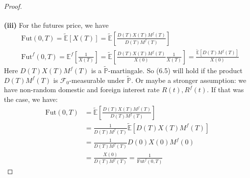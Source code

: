 \documentclass[a4paper, 10pt]{article}
\theoremstyle{definition}
\theoremstyle{hSol}
\begin{document}
\begin{proof}
\begin{equation}
\end{equation}
~\\
\textbf{(iii)} For the futures price, we have
\begin{equation}
  \begin{split}
    &\text{Fut}(0,T) = \widetilde{\mathbb{E}}\left[X(T)\right] = \widetilde{\mathbb{E}}\left[\frac{D(T)X(T)M^f(T)}{D(T)M^f(T)}\right] \\
    &\text{Fut}^f(0,T) = \mathbb{E}^f\left[\frac{1}{X(T)}\right] = \widetilde{\mathbb{E}}\left[\frac{D(T)X(T)M^f(T)}{X(0)}\frac{1}{X(T)}\right] = \frac{\widetilde{\mathbb{E}}\left[D(T)M^f(T)\right]}{X(0)}
  \end{split}
\end{equation}
Here $D(T)X(T)M^f(T)$ is a $\widetilde{\mathbb{P}}$-martingale. So (6.5) will hold if the product $D(T)M^f(T)$ is $\mathcal{F}_0$-measurable under $\widetilde{\mathbb{P}}$. Or maybe a stronger assumption: we have non-random domestic and foreign interest rate $R(t), R^f(t)$. If that was the case, we have:
\begin{equation}
  \begin{split}
    \text{Fut}(0,T) &= \widetilde{\mathbb{E}}\left[\frac{D(T)X(T)M^f(T)}{D(T)M^f(T)}\right] \\
    &= \frac{1}{D(T)M^f(T)}\widetilde{\mathbb{E}}\left[D(T)X(T)M^f(T)\right] \\
    &= \frac{1}{D(T)M^f(T)}D(0)X(0)M^f(0) \\
    &= \frac{X(0)}{D(T)M^f(T)} = \frac{1}{\text{Fut}^f(0,T)}
  \end{split}
\end{equation}
\end{proof}
\end{document}
